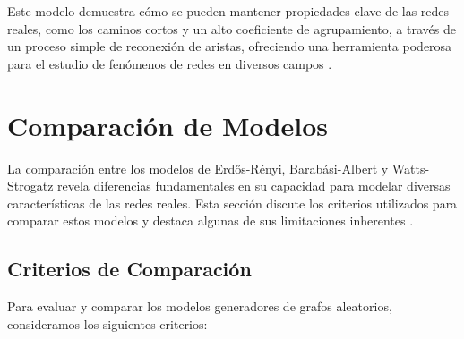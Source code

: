 Este modelo demuestra cómo se pueden mantener propiedades clave de las redes reales, como los caminos cortos y un alto coeficiente de agrupamiento, a través de un proceso simple de reconexión de aristas, ofreciendo una herramienta poderosa para el estudio de fenómenos de redes en diversos campos .

\section{Comparación de Modelos}
La comparación entre los modelos de Erdős-Rényi, Barabási-Albert y Watts-Strogatz revela diferencias fundamentales en su capacidad para modelar diversas características de las redes reales. Esta sección discute los criterios utilizados para comparar estos modelos y destaca algunas de sus limitaciones inherentes .

\subsection{Criterios de Comparación}
Para evaluar y comparar los modelos generadores de grafos aleatorios, consideramos los siguientes criterios:

